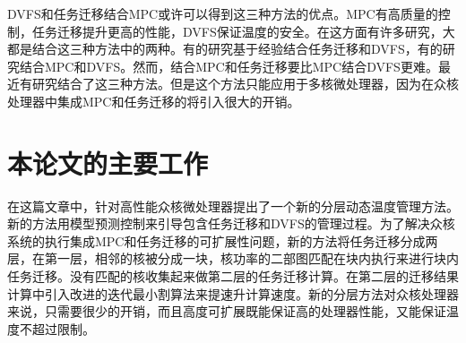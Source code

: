  DVFS和任务迁移结合MPC或许可以得到这三种方法的优点。MPC有高质量的控制，任务迁移提升更高的性能，DVFS保证温度的安全。在这方面有许多研究，大都是结合这三种方法中的两种。有的研究基于经验结合任务迁移和DVFS，有的研究结合MPC和DVFS。然而，结合MPC和任务迁移要比MPC结合DVFS更难。最近有研究结合了这三种方法。但是这个方法只能应用于多核微处理器，因为在众核处理器中集成MPC和任务迁移的将引入很大的开销。
 
 \section{本论文的主要工作}\label{sec:thispaper}
在这篇文章中，针对高性能众核微处理器提出了一个新的分层动态温度管理方法。新的方法用模型预测控制来引导包含任务迁移和DVFS的管理过程。为了解决众核系统的执行集成MPC和任务迁移的可扩展性问题，新的方法将任务迁移分成两层，在第一层，相邻的核被分成一块，核功率的二部图匹配在块内执行来进行块内任务迁移。没有匹配的核收集起来做第二层的任务迁移计算。在第二层的迁移结果计算中引入改进的迭代最小割算法来提速升计算速度。新的分层方法对众核处理器来说，只需要很少的开销，而且高度可扩展既能保证高的处理器性能，又能保证温度不超过限制。